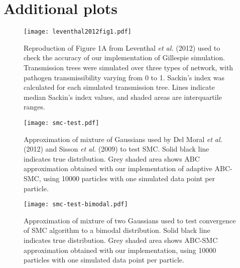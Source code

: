 

\chapter{Additional plots}

\begin{figure}[ht]
  \centering
  \texttt{[image: leventhal2012fig1.pdf]}
  \caption[
    Reproduction of Figure 1A from Leventhal \textit{et al.} (2012) used to
    check the accuracy of our implementation of Gillespie simulation.
  ]{
    Reproduction of Figure 1A from Leventhal \textit{et al.} (2012) used to
    check the accuracy of our implementation of Gillespie simulation.
    Transmission trees were simulated over three types of network, with
    pathogen transmissibility varying from 0 to 1. Sackin's index was
    calculated for each simulated transmission tree. Lines indicate median
    Sackin's index values, and shaded areas are interquartile ranges.
  }
  \label{fig:leventhal}
\end{figure}

\begin{figure}[ht]
  \centering
  \texttt{[image: smc-test.pdf]}
  \caption[
      Approximation of mixture of Gaussians used by Del Moral \textit{et al.}
      (2012) and Sisson \textit{et al.} (2009) to test adaptive
      \gls{ABC}-\gls{SMC}.
    ]{
      Approximation of mixture of Gaussians used by Del Moral \textit{et al.}
      (2012) and Sisson \textit{et al.} (2009) to test SMC. Solid black line
      indicates true distribution. Grey shaded area shows \gls{ABC}
      approximation obtained with our implementation of adaptive
      \gls{ABC}-\gls{SMC}, using 10000 particles with one simulated data point
      per particle.
    }
  \label{fig:smctest}
\end{figure}

\begin{figure}[ht]
  \centering
  \texttt{[image: smc-test-bimodal.pdf]}
  \caption[
    Approximation of mixture of two Gaussians used to test convergence of
    adaptive \gls{ABC}-\gls{SMC} algorithm to a bimodal distribution.
  ]{
    Approximation of mixture of two Gaussians used to test convergence of SMC
    algorithm to a bimodal distribution. Solid black line indicates true
    distribution. Grey shaded area shows \gls{ABC}-\gls{SMC} approximation
    obtained with our implementation, using 10000 particles with one simulated
    data point per particle.
  }
  \label{fig:smctest2}
\end{figure}

